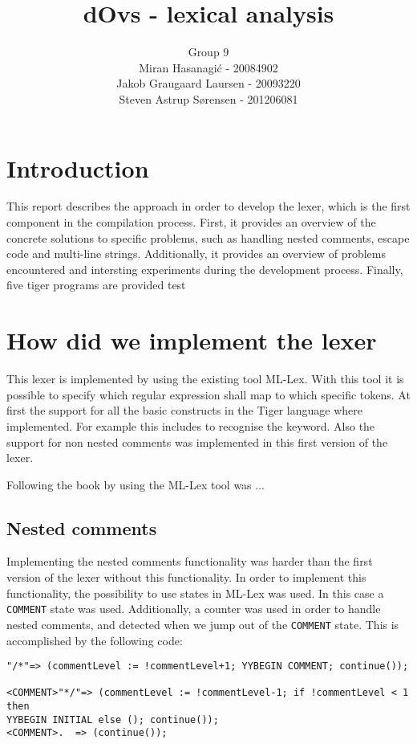 \documentclass{article}
\title{dOvs - lexical analysis}
\author{
  Group 9 \\
  Miran Hasanagi\'{c} - 20084902 \\
  Jakob Graugaard Laursen - 20093220\\
  Steven Astrup S\o rensen - 201206081
}
\begin{document}
\maketitle

\section{Introduction}
This report describes the approach in order to develop the lexer, which is the first component in the compilation process. 
First, it provides an overview of the concrete solutions to specific problems, such as handling nested comments, escape code and multi-line strings. 
Additionally, it provides an overview of problems encountered and intersting experiments during the development process. Finally, five tiger programs are provided test 

\section{How did we implement the lexer}
This lexer is implemented by using the existing tool ML-Lex. With this tool it is possible to specify which regular expression shall map to which specific tokens. At first the support for all the basic constructs in the Tiger language where implemented. For example this includes to recognise the keyword. Also the support for non nested comments was implemented in this first version of the lexer. 

Following the book by using the ML-Lex tool was ...

\subsection{Nested comments}
Implementing the nested comments functionality was harder than the first version of the lexer without this functionality. In order to implement this functionality, the possibility to use states in ML-Lex was used. In this case a \texttt{COMMENT} state was used. Additionally, a counter was used in order to handle nested comments, and detected when we jump out of the \texttt{COMMENT} state. This is accomplished by the following code:

\begin{lstlisting}[frame=single]
"/*"=> (commentLevel := !commentLevel+1; YYBEGIN COMMENT; continue());

<COMMENT>"*/"=> (commentLevel := !commentLevel-1; if !commentLevel < 1 then 
YYBEGIN INITIAL else (); continue());
<COMMENT>.	=> (continue());
\end{lstlisting}
\end{document}
